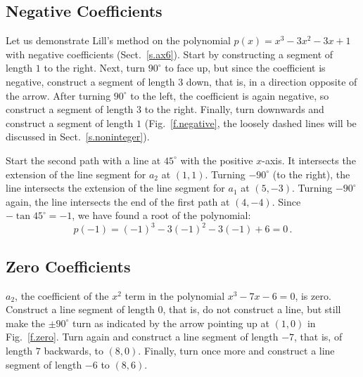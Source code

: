 \subsection{Negative Coefficients}\label{s.negative}
Let us demonstrate Lill's method on the polynomial $p(x)=x^3-3x^2-3x+1$ with negative coefficients (Sect.~\ref{s.ax6}). Start by constructing a segment of length $1$ to the right. Next, turn $90^\circ$ to face up, but since the coefficient is negative, construct a segment of length $3$ down, that is, in a direction opposite of the arrow. After turning $90^\circ$ to the left, the coefficient is again negative, so construct a segment of length $3$ to the right. Finally, turn downwards and construct a segment of length $1$ (Fig.~\ref{f.negative}, the loosely dashed lines will be discussed  in Sect.~\ref{s.noninteger}).

Start the second path with a line at $45^\circ$ with the positive $x$-axis. It intersects the extension of the line segment for $a_2$ at $(1,1)$. Turning $-90^\circ$ (to the right), the line intersects the extension of the line segment for $a_1$ at $(5,-3)$. Turning $-90^\circ$ again, the line intersects the end of the first path at $(4,-4)$. Since $-\tan 45^\circ=-1$, we have found a root of the polynomial:
\[p(-1)=(-1)^3-3(-1)^2-3(-1)+6=0\,.\]


\subsection{Zero Coefficients}\label{s.zero}
$a_2$, the coefficient of the $x^2$ term in the polynomial $x^3-7x-6=0$, is zero. Construct a line segment of length $0$, that is, do not construct a line, but still make the $\pm 90^\circ$ turn as indicated by the arrow pointing up at $(1,0)$ in Fig.~\ref{f.zero}. Turn again and construct a line segment of length $-7$, that is, of length $7$ backwards, to $(8,0)$. Finally, turn once more and construct a line segment of length $-6$ to $(8,6)$.

